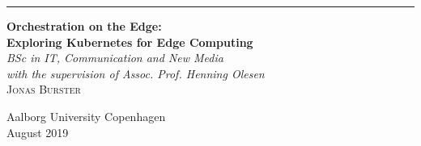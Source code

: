 




\begin{titlepage}
\noindent
\begin{minipage}{\textwidth}
\rule{1.5pt}{0.2\textheight}%

\vspace{5mm}
\noindent
{\Huge\bfseries Orchestration on the Edge:\\[0.28\baselineskip]
Exploring Kubernetes for Edge Computing}\\[2\baselineskip]
{\large \textit{BSc in IT, Communication and New Media\\with the supervision of Assoc. Prof. Henning Olesen}}\\[4\baselineskip]
{\Large \textsc{Jonas Burster}} %

\vspace{0.1\textheight} %
\noindent
Aalborg University Copenhagen \\
August 2019
\\[\baselineskip] %
\makebox[0pt][l]{\rule{1.5pt}{0.33\textheight}}%
\end{minipage}
\end{titlepage}

